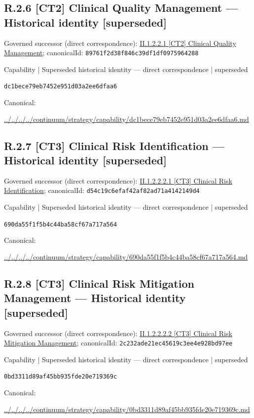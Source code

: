 \documentclass[10pt,a4paper]{article}
\begin{document}
\subsection*{R.2.6 [CT2] Clinical Quality Management — Historical identity [superseded]}
Governed successor (direct correspondence): \hyperref[element-89761f2d38f846c39df1df0975964288]{II.1.2.2.1 [CT2] Clinical Quality Management}; canonicalId: \texttt{89761f2d38f846c39df1df0975964288}\par
\label{element-dc1bece79eb7452e951d03a2ee6dfaa6}
{\small Capability | Superseded historical identity — direct correspondence | superseded}\par
\texttt{dc1bece79eb7452e951d03a2ee6dfaa6}\par
Canonical: \par
{\footnotesize\url{../../../../continuum/strategy/capability/dc1bece79eb7452e951d03a2ee6dfaa6.md}}\par
\subsection*{R.2.7 [CT3] Clinical Risk Identification — Historical identity [superseded]}
Governed successor (direct correspondence): \hyperref[element-d54c19c6efaf42af82ad71a4142149d4]{II.1.2.2.2.1 [CT3] Clinical Risk Identification}; canonicalId: \texttt{d54c19c6efaf42af82ad71a4142149d4}\par
\label{element-690da55f1f5b4c44ba58cf67a717a564}
{\small Capability | Superseded historical identity — direct correspondence | superseded}\par
\texttt{690da55f1f5b4c44ba58cf67a717a564}\par
Canonical: \par
{\footnotesize\url{../../../../continuum/strategy/capability/690da55f1f5b4c44ba58cf67a717a564.md}}\par
\subsection*{R.2.8 [CT3] Clinical Risk Mitigation Management — Historical identity [superseded]}
Governed successor (direct correspondence): \hyperref[element-2c232ade21ec45619c3ee4e928bd97ee]{II.1.2.2.2.2 [CT3] Clinical Risk Mitigation Management}; canonicalId: \texttt{2c232ade21ec45619c3ee4e928bd97ee}\par
\label{element-0bd3311d89af45bb935fde20e719369c}
{\small Capability | Superseded historical identity — direct correspondence | superseded}\par
\texttt{0bd3311d89af45bb935fde20e719369c}\par
Canonical: \par
{\footnotesize\url{../../../../continuum/strategy/capability/0bd3311d89af45bb935fde20e719369c.md}}\par
\end{document}

